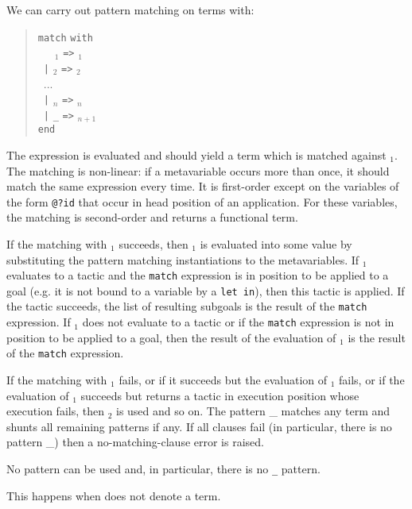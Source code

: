 We can carry out pattern matching on terms with:
\begin{quote}
{\tt match} {\tacexpr} {\tt with}\\
~~~{\cpattern}$_1$ {\tt =>} {\tacexpr}$_1$\\
~{\tt |} {\cpattern}$_2$ {\tt =>} {\tacexpr}$_2$\\
~...\\
~{\tt |} {\cpattern}$_n$ {\tt =>} {\tacexpr}$_n$\\
~{\tt |} {\tt \_} {\tt =>} {\tacexpr}$_{n+1}$\\
{\tt end}
\end{quote}
The expression {\tacexpr} is evaluated and should yield a term which
is matched against {\cpattern}$_1$. The matching is non-linear: if a
metavariable occurs more than once, it should match the same
expression every time. It is first-order except on the
variables of the form {\tt @?id} that occur in head position of an
application. For these variables, the matching is second-order and
returns a functional term.

If the matching with {\cpattern}$_1$ succeeds, then {\tacexpr}$_1$ is
evaluated into some value by substituting the pattern matching
instantiations to the metavariables. If {\tacexpr}$_1$ evaluates to a
tactic and the {\tt match} expression is in position to be applied to
a goal (e.g. it is not bound to a variable by a {\tt let in}), then
this tactic is applied. If the tactic succeeds, the list of resulting
subgoals is the result of the {\tt match} expression. If
{\tacexpr}$_1$ does not evaluate to a tactic or if the {\tt match}
expression is not in position to be applied to a goal, then the result
of the evaluation of {\tacexpr}$_1$ is the result of the {\tt match}
expression.

If the matching with {\cpattern}$_1$ fails, or if it succeeds but the
evaluation of {\tacexpr}$_1$ fails, or if the evaluation of
{\tacexpr}$_1$ succeeds but returns a tactic in execution position
whose execution fails, then {\cpattern}$_2$ is used and so on.  The
pattern {\_} matches any term and shunts all remaining patterns if
any. If all clauses fail (in particular, there is no pattern {\_})
then a no-matching-clause error is raised.

\begin{ErrMsgs}

\item {}

  No pattern can be used and, in particular, there is no {\tt \_} pattern.

\item {}

  This happens when {\tacexpr} does not denote a term.

\end{ErrMsgs}

